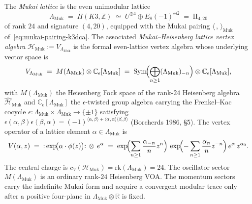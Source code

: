 \begin{definition}
\label{def:mukai-voa}
The \emph{Mukai lattice} is the even unimodular lattice
\[
 \Lambda_{\mathrm{Muk}}
 \;=\;
 \widetilde{H}(K3,\mathbb{Z})
 \;\simeq\;
 U^{\oplus 4}\oplus E_8(-1)^{\oplus 2}
 \;=\;
 \mathrm{II}_{4,20}
\]
of rank $24$ and signature $(4,20)$, equipped with the Mukai pairing
$\langle\,,\,\rangle_{\mathrm{Muk}}$ of~\eqref{eq:mukai-pairing-k3dca}.
The associated \emph{Mukai--Heisenberg lattice vertex algebra}
$\mathcal{H}_{\mathrm{Muk}} := V_{\Lambda_{\mathrm{Muk}}}$ is the formal
even-lattice vertex algebra whose underlying vector space is
\[
 V_{\Lambda_{\mathrm{Muk}}}
 \;=\;
 M(\Lambda_{\mathrm{Muk}})\otimes \mathbb{C}_\epsilon[\Lambda_{\mathrm{Muk}}]
 \;=\;
 \mathrm{Sym}\!\Bigl(\bigoplus_{n\geq 1}(\Lambda_{\mathrm{Muk}})_{-n}\Bigr)
 \otimes
 \mathbb{C}_\epsilon[\Lambda_{\mathrm{Muk}}],
\]
with $M(\Lambda_{\mathrm{Muk}})$ the Heisenberg Fock space of the rank-$24$
Heisenberg algebra $\widehat{\mathcal{H}}_{\mathrm{Muk}}$ and
$\mathbb{C}_\epsilon[\Lambda_{\mathrm{Muk}}]$ the $\epsilon$-twisted group algebra
carrying the Frenkel--Kac cocycle
$\epsilon\colon\Lambda_{\mathrm{Muk}}\times\Lambda_{\mathrm{Muk}}\to\{\pm 1\}$
satisfying
$\epsilon(\alpha,\beta)\epsilon(\beta,\alpha) = (-1)^{\langle\alpha,\beta\rangle
+ \langle\alpha,\alpha\rangle\langle\beta,\beta\rangle}$
(Borcherds 1986, §5). The vertex operator of a lattice element
$\alpha\in\Lambda_{\mathrm{Muk}}$ is
\begin{equation}
\label{eq:mukai-vertex-operator}
 V(\alpha, z)
 \;=\;
 {:}\exp\!\bigl(\alpha\cdot\phi(z)\bigr){:}\,\otimes\, e^\alpha
 \;=\;
 \exp\!\Bigl(\sum_{n\geq 1}\frac{\alpha_{-n}}{n}z^n\Bigr)\,
 \exp\!\Bigl(-\sum_{n\geq 1}\frac{\alpha_n}{n}z^{-n}\Bigr)\,e^\alpha\,z^{\alpha_0}.
\end{equation}
The central charge is $c_V(\mathcal{H}_{\mathrm{Muk}}) = \mathrm{rk}(\Lambda_{\mathrm{Muk}}) = 24$.
The oscillator sector $M(\Lambda_{\mathrm{Muk}})$ is an ordinary rank-$24$
Heisenberg VOA. The momentum sectors carry the indefinite Mukai form and
acquire a convergent modular trace only after a positive four-plane in
$\Lambda_{\mathrm{Muk}}\otimes\mathbb R$ is fixed.
\end{definition}

